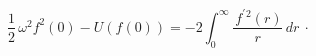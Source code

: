 \begin{equation}
\frac{1}{2}\,\omega ^{2}f^{2}(0)-U\left( f(0)\right) =-2\int_{0}^{\infty }%
\frac{\,f^{\prime }{}^{2}(r)}{r}\,dr\ \cdot   \label{fric}
\end{equation}%
